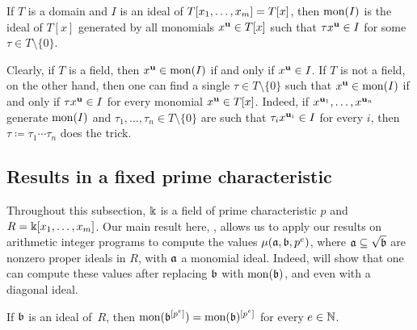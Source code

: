 \documentclass{amsart}
\begin{document}
\begin{definition}
\label{monomialization: D}
If $T$ is a domain and $I$ is an ideal of $T[x_1, \ldots, x_m]=T[x]$, then $\operatorname{mon}(I)$ is the ideal of $T[x]$ generated by all monomials $x^{\mathbf{u}} \in T[x]$ such that $\tau x^{\mathbf{u}} \in I$ for some $\tau \in T \setminus \{0\}$.
\end{definition}

\begin{remark}
\label{single multiplier: R}
Clearly, if $T$ is a field, then $x^{\mathbf{u}} \in \operatorname{mon}(I)$ if and only if $x^{\mathbf{u}} \in I$.
If $T$ is not a field, on the other hand, then one can find a single $\tau \in T \setminus \{0\}$ such that $x^{\mathbf{u}} \in \operatorname{mon}(I)$ if and only if $\tau x^{\mathbf{u}} \in I$ for every monomial $x^{\mathbf{u}} \in T[x]$.
Indeed, if $x^{\mathbf{u}_1}, \ldots, x^{\mathbf{u}_n}$ generate $\operatorname{mon}(I)$ and $\tau_1, \ldots, \tau_n \in T\setminus\{0\}$ are such that $\tau_i x^{\mathbf{u}_i} \in I$ for every $i$, then $\tau\coloneqq \tau_1 \cdots \tau_n$ does the trick.
\end{remark}

\subsection{Results in a fixed prime characteristic}

Throughout this subsection, $\Bbbk$ is a field of prime characteristic $p$ and $R=\Bbbk[x_1,\ldots,x_m]$.
Our main result here, , allows us to apply our results on arithmetic integer programs to compute the values $\mu(\mathfrak{a},\mathfrak{b},p^e)$, where $\mathfrak{a} \subseteq \sqrt {\mathfrak{b}}$ are nonzero proper ideals in $R$, with $\mathfrak{a}$ a monomial ideal.
Indeed,  will show that one can compute these values after replacing $\mathfrak{b}$ with $\operatorname{mon}(\mathfrak{b})$, and even with a diagonal ideal.

\begin{lemma} \label{frobenius-powers+mon-commute: L}
   If $\mathfrak{b}$ is an ideal of~$R$, then $\operatorname{mon}(\mathfrak{b}^{[p^e]}) = \operatorname{mon}(\mathfrak{b})^{[p^e]}$ for every $e \in \mathbb{N}$.
\end{lemma}
\end{document}
